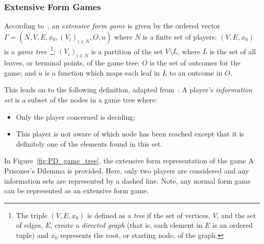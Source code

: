 \subsubsection{Extensive Form Games}\label{subsubsec:Extensive_Form_Games}
According to~\cite{maschler_solan_zamir_2013}, an \textit{extensive form game}
is given by the ordered vector
\(\Gamma = (N, V, E, x_{0}, (V_{i})_{i \in N}, O, u)\)
where \(N\) is a finite set of players; \((V, E, x_{0})\) is a \textit{game
tree}~\footnote{The triple \((V, E, x_{0})\) is defined as a \textit{tree} if
the set of vertices, \(V\), and the set of edges, \(E\), create a
\textit{directed graph} (that is, each element in \(E\) is an ordered tuple) and
\(x_{0}\) represents the root, or starting node, of the graph.}; \((V_{i})_{i \in
N}\) is a partition of the set \(V \setminus L\), where \(L\) is the set of all
leaves, or terminal points, of the game tree; \(O\) is the set of outcomes for
the game; and \(u\) is a function which maps each leaf in \(L\) to an outcome 
in \(O\).

This leads on to the following definition, adapted from~\cite{Webb2007}:
\newline
A player's \textit{information set} is a subset of the nodes in a game tree
where:
\begin{itemize}
    \item Only the player concerned is deciding;
    \item This player is not aware of which node has been reached except that it
    is definitely one of the elements found in this set.
\end{itemize} 

In Figure~\ref{fig:PD_game_tree}, the extensive form representation of the
game A Prisoner's Dilemma is provided. Here, only two players are considered and
any information sets are represented by a dashed line. Note, any normal form
game can be represented as an extensive form game. 


